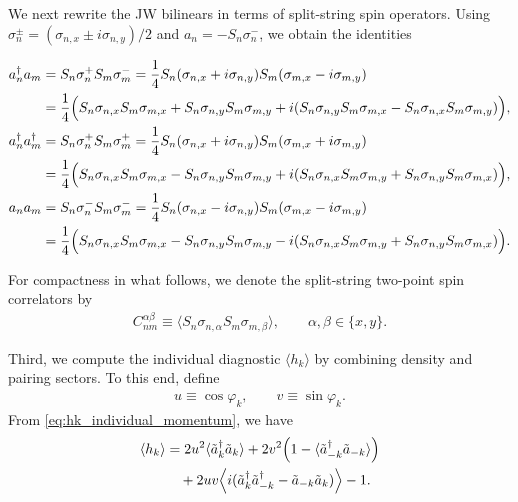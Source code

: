 \documentclass[aps,prx,twocolumn,superscriptaddress,nofootinbib,nolongbibliography,nobalancelastpage,10pt,floatfix]{revtex4-2}
\begin{document}

We next rewrite the JW bilinears in terms of split-string spin operators. Using $\sigma_n^\pm = (\sigma_{n,x} \pm i\sigma_{n,y})/2$ and $a_n = -S_n \sigma_n^-$, we obtain the identities
\begin{widetext}
    \begin{align}
        a_n^\dag a_m      &= S_n \sigma_n^+ S_m \sigma_m^- = \frac{1}{4} S_n (\sigma_{n,x}+i\sigma_{n,y}) S_m (\sigma_{m,x}-i\sigma_{m,y})\nonumber\\
                          &= \frac{1}{4}\Big( S_n \sigma_{n,x} S_m \sigma_{m,x} + S_n \sigma_{n,y} S_m \sigma_{m,y}
        + i(S_n \sigma_{n,y} S_m \sigma_{m,x} - S_n \sigma_{n,x} S_m \sigma_{m,y}) \Big),
        \label{eq:JW_bilin_1}\\
        a_n^\dag a_m^\dag &= S_n \sigma_n^+ S_m \sigma_m^+ = \frac{1}{4} S_n (\sigma_{n,x}+i\sigma_{n,y}) S_m (\sigma_{m,x}+i\sigma_{m,y})\nonumber\\
                          &= \frac{1}{4}\Big( S_n \sigma_{n,x} S_m \sigma_{m,x} - S_n \sigma_{n,y} S_m \sigma_{m,y}
        + i(S_n \sigma_{n,x} S_m \sigma_{m,y} + S_n \sigma_{n,y} S_m \sigma_{m,x}) \Big),
        \label{eq:JW_bilin_2}\\
        a_n a_m           &= S_n \sigma_n^- S_m \sigma_m^- = \frac{1}{4} S_n (\sigma_{n,x}-i\sigma_{n,y}) S_m (\sigma_{m,x}-i\sigma_{m,y})\nonumber\\
                          &= \frac{1}{4}\Big( S_n \sigma_{n,x} S_m \sigma_{m,x} - S_n \sigma_{n,y} S_m \sigma_{m,y}
        - i(S_n \sigma_{n,x} S_m \sigma_{m,y} + S_n \sigma_{n,y} S_m \sigma_{m,x}) \Big).
        \label{eq:JW_bilin_3}
    \end{align}
\end{widetext}
For compactness in what follows, we denote the split-string two-point spin correlators by
\begin{align}
    C^{\alpha\beta}_{nm} \equiv \big\langle S_n \sigma_{n,\alpha} S_m \sigma_{m,\beta} \big\rangle , \qquad \alpha,\beta\in\{x,y\}.
\end{align}

Third, we compute the individual diagnostic $\langle h_k\rangle$ by combining density and pairing sectors. To this end, define
\begin{align}
    u \equiv \cos\varphi_k,\qquad v\equiv\sin\varphi_k.
\end{align}
From \cref{eq:hk_individual_momentum}, we have
\begin{align}
    \langle h_k\rangle
    &= 2u^2\langle\tilde{a}_k^\dag\tilde{a}_k\rangle
    +2v^2\Big(1-\langle\tilde{a}_{-k}^\dag\tilde{a}_{-k}\rangle\Big)\nonumber\\
    &\quad
    +2uv\Big\langle i(\tilde{a}_k^\dag\tilde{a}_{-k}^\dag-\tilde{a}_{-k}\tilde{a}_k)\Big\rangle-1.
    \label{eq:hk_expect_split}
\end{align}
\end{document}
